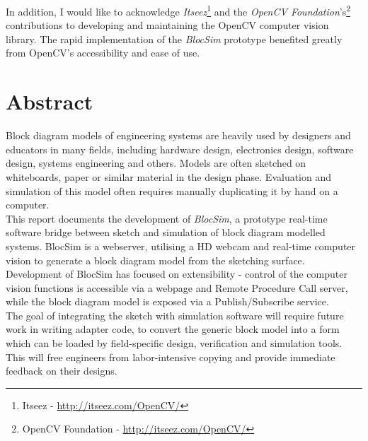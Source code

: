In addition, I would like to acknowledge \textit{Itseez}\footnote{Itseez - \url{http://itseez.com/OpenCV/}} and the \textit{OpenCV Foundation}'s\footnote{OpenCV Foundation - \url{http://itseez.com/OpenCV/}} contributions to developing and maintaining the OpenCV computer vision library. The rapid implementation of the \textit{BlocSim} prototype benefited greatly from OpenCV's accessibility and ease of use.


\chapter{Abstract}

Block diagram models of engineering systems are heavily used by designers and educators in many fields, including hardware design, electronics design, software design, systems engineering and others. Models are often sketched on whiteboards, paper or similar material in the design phase. Evaluation and simulation of this model often requires manually duplicating it by hand on a computer.
\\

This report documents the development of \textit{BlocSim}, a prototype real-time software bridge between sketch and simulation of block diagram modelled systems. BlocSim is a webserver, utilising a HD webcam and real-time computer vision to generate a block diagram model from the sketching surface. Development of BlocSim has focused on extensibility - control of the computer vision functions is accessible via a webpage and Remote Procedure Call server, while the block diagram model is exposed via a Publish/Subscribe service.
\\

The goal of integrating the sketch with simulation software will require future work in writing adapter code, to convert the generic block model into a form which can be loaded by field-specific design, verification and simulation tools. This will free engineers from labor-intensive copying and provide immediate feedback on their designs.


\begin{comment}

\end{comment}
